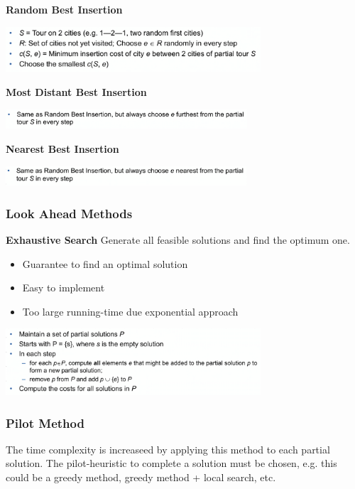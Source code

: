 \documentclass[10pt,a4paper,twocolumn]{article}
\newcommand\pro{\item[$+$]}
\newcommand\con{\item[$-$]}
\begin{document}
\textbf{Random Best Insertion}
\begin{center}
\includegraphics[width=9.5cm]{images/random-best-insertion}
\end{center}

\textbf{Most Distant Best Insertion}
\begin{center}
\includegraphics[width=9cm]{images/most-distant-best-insertion}
\end{center}

\textbf{Nearest Best Insertion}
\begin{center}
\includegraphics[width=9cm]{images/nearest-best-insertion}
\end{center}



\subsubsection{Look Ahead Methods}

\textbf{Exhaustive Search}
Generate all feasible solutions and find the optimum one.
\begin{itemize}
	\pro Guarantee to find an optimal solution
	\pro Easy to implement
	\con Too large running-time due exponential approach
\end{itemize}

\begin{center}
\includegraphics[width=9.5cm]{images/exhaustive-search}
\end{center}

\subsubsection{Pilot Method}
The time complexity is increaseed by applying this method to each partial solution. The pilot-heuristic to complete a solution must be chosen, e.g. this could be a greedy method, greedy method + local search, etc.
\end{document}
